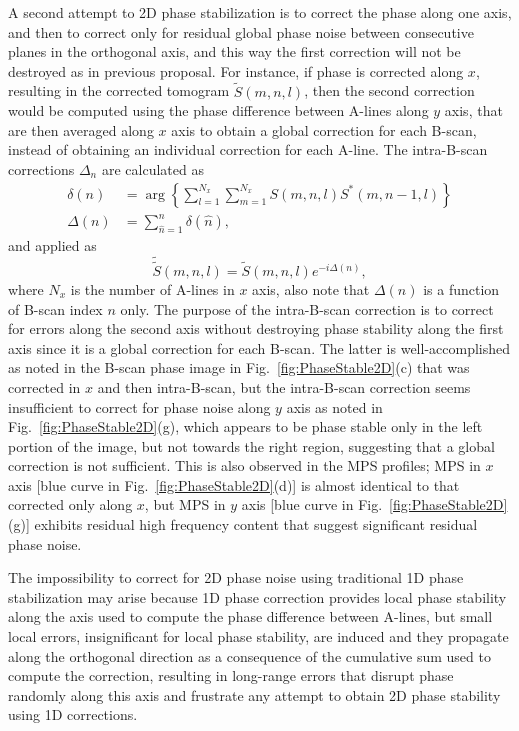 A second attempt to 2D phase stabilization is to correct the phase along one axis, and then to correct only for residual global phase noise between consecutive planes in the orthogonal axis, and this way the first correction will not be destroyed as in previous proposal. For instance, if phase is corrected along $x$, resulting in the corrected tomogram $\tilde{S}(m,n,l)$, then the second correction would be computed using the phase difference between A-lines along $y$ axis, that are then averaged along $x$ axis to obtain a global correction for each B-scan, instead of obtaining an individual correction for each A-line. The intra-B-scan corrections $\Delta_n$ are calculated as
\begin{align}
    \delta(n) &= \arg\left\{\sum_{l=1}^{N_x} \sum_{m=1}^{N_x} S(m,n,l) S^*(m,n-1,l)\right\} \nonumber\\
    \Delta(n) &= \sum_{\hat{n} = 1}^n\delta(\hat{n}),
\end{align}
and applied as
\begin{equation}
    \tilde{\tilde{S}}(m,n,l) = \tilde{S}(m,n,l) e^{-i\Delta(n)},
\end{equation}
where $N_x$ is the number of A-lines in $x$ axis, also note that $\Delta(n)$ is a function of B-scan index $n$ only. The purpose of the intra-B-scan correction is to correct for errors along the second axis without destroying phase stability along the first axis since it is a global correction for each B-scan. The latter is well-accomplished as noted in the B-scan phase image in Fig.~\ref{fig:PhaseStable2D}(c) that was corrected in $x$ and then intra-B-scan, but the intra-B-scan correction seems insufficient to correct for phase noise along $y$ axis as noted in Fig.~\ref{fig:PhaseStable2D}(g), which appears to be phase stable only in the left portion of the image, but not towards the right region, suggesting that a global correction is not sufficient. This is also observed in the MPS profiles; MPS in $x$ axis [blue curve in Fig.~\ref{fig:PhaseStable2D}(d)] is almost identical to that corrected only along $x$, but MPS in $y$ axis [blue curve in Fig.~\ref{fig:PhaseStable2D}(g)] exhibits residual high frequency content that suggest significant residual phase noise.

The impossibility to correct for 2D phase noise using traditional 1D phase stabilization may arise because 1D phase correction provides local phase stability along the axis used to compute the phase difference between A-lines, but small local errors, insignificant for local phase stability, are induced and they propagate along the orthogonal direction as a consequence of the cumulative sum used to compute the correction, resulting in long-range errors that disrupt phase randomly along this axis and frustrate any attempt to obtain 2D phase stability using 1D corrections.

